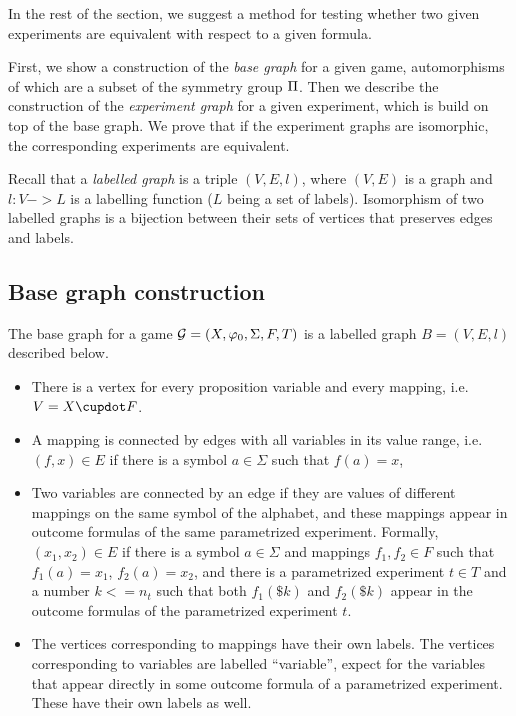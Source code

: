 In the rest of the section, we suggest a method for testing
  whether two given experiments are equivalent with respect to a given formula.

First, we show a construction of the \emph{base graph} for a given game,
  automorphisms of which are a subset of the symmetry group $\Pi$.
Then we describe the construction of the \emph{experiment graph} for a given experiment,
  which is build on top of the base graph.
  We prove
  that if the experiment graphs are isomorphic,
  the corresponding experiments are equivalent.

Recall that a \emph{labelled graph} is a triple $(V, E, l)$, where
  $(V, E)$ is a graph and $l: V->L$
  is a labelling function ($L$ being a set of labels).
Isomorphism of two labelled graphs is a bijection between their sets of vertices
that preserves edges and labels.

\subsection{Base graph construction}

The base graph for a game $\mathcal{G} = (X, \varphi_0, \Sigma, F, T)$ is a labelled graph $B = (V,E,l)$ described below.
\begin{itemize}
\item There is a vertex for every proposition variable and every mapping, i.e. $V = \Var \cupdot F$.
\item A mapping is connected by edges with all variables in its value range, i.e. $(f, x) \in E$ if there is a symbol $a\in\Sigma$ such that $f(a) = x$,
\item Two variables are connected by an edge if they are values
  of different mappings on the same symbol of the alphabet,
  and these mappings appear in outcome formulas of the same parametrized experiment.
  Formally, $(x_1, x_2) \in E$ if there is a symbol $a\in\Sigma$ and mappings
  $f_1,f_2\in F$ such that $f_1(a) = x_1$, $f_2(a) = x_2$, and
  there is a parametrized experiment $t\in T$ and a number $k <= n_t$ such that
  both $f_1(\$k)$ and $f_2(\$k)$ appear in the outcome formulas of the
  parametrized experiment $t$.
\item
  The vertices corresponding to mappings have their own labels.
  The vertices corresponding to variables are labelled ``variable'',
  expect for the variables that appear directly in some outcome formula
  of a parametrized experiment. These have their own labels as well.
\end{itemize}

